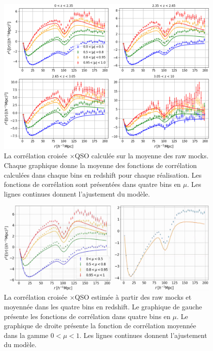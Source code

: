 \begin{figure}
  \centering
  \includegraphics[scale=0.4]{xcf_ebossraw_4bins}
  \caption{La corrélation croisée \lya{}$\times$QSO calculée sur la moyenne des \Nmocks{} raw mocks. Chaque graphique donne la moyenne des fonctions de corrélation calculées dans chaque bins en redshift pour chaque réalisation. Les fonctions de corrélation sont présentées dans quatre bins en $\mu$. Les lignes continues donnent l'ajustement du modèle.}
  \label{fig:xcf_ebossraw_4bins}
\end{figure}
\begin{figure}
  \centering
  \includegraphics[scale=0.4]{xcf_ebossraw}
  \caption{La corrélation croisée \lya{}$\times$QSO estimée à partir des raw mocks et moyennée dans les quatre bins en redshift. Le graphique de gauche présente les fonctions de corrélation dans quatre bins en $\mu$. Le graphique de droite présente la fonction de corrélation moyennée dans la gamme $0 < \mu < 1$. Les lignes continues donnent l'ajustement du modèle.}
  \label{fig:xcf_ebossraw}
\end{figure}



